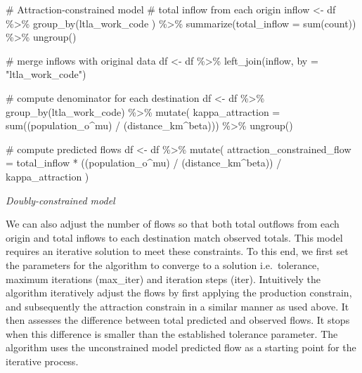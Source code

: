 \documentclass[
  a4paper, 
  twoside,
  final
]{article}
\newenvironment{Shaded}{\begin{snugshade}}{\end{snugshade}}
\newcommand{\AttributeTok}[1]{\textcolor[rgb]{0.40,0.45,0.13}{#1}}
\newcommand{\CommentTok}[1]{\textcolor[rgb]{0.37,0.37,0.37}{#1}}
\newcommand{\FunctionTok}[1]{\textcolor[rgb]{0.28,0.35,0.67}{#1}}
\newcommand{\NormalTok}[1]{\textcolor[rgb]{0.00,0.23,0.31}{#1}}
\newcommand{\OtherTok}[1]{\textcolor[rgb]{0.00,0.23,0.31}{#1}}
\newcommand{\SpecialCharTok}[1]{\textcolor[rgb]{0.37,0.37,0.37}{#1}}
\newcommand{\StringTok}[1]{\textcolor[rgb]{0.13,0.47,0.30}{#1}}
\newcounter{code}
\begin{document}
\begin{Shaded}
\begin{Highlighting}[]
\CommentTok{\# Attraction{-}constrained model}
\CommentTok{\# total inflow from each origin}
\NormalTok{inflow }\OtherTok{\textless{}{-}}\NormalTok{ df }\SpecialCharTok{\%\textgreater{}\%}
  \FunctionTok{group\_by}\NormalTok{(ltla\_work\_code ) }\SpecialCharTok{\%\textgreater{}\%}
  \FunctionTok{summarize}\NormalTok{(}\AttributeTok{total\_inflow =} \FunctionTok{sum}\NormalTok{(count)) }\SpecialCharTok{\%\textgreater{}\%} 
  \FunctionTok{ungroup}\NormalTok{()}

\CommentTok{\# merge inflows with original data}
\NormalTok{df }\OtherTok{\textless{}{-}}\NormalTok{ df }\SpecialCharTok{\%\textgreater{}\%}
  \FunctionTok{left\_join}\NormalTok{(inflow, }\AttributeTok{by =} \StringTok{"ltla\_work\_code"}\NormalTok{)}

\CommentTok{\# compute denominator for each destination}
\NormalTok{df }\OtherTok{\textless{}{-}}\NormalTok{ df }\SpecialCharTok{\%\textgreater{}\%}
  \FunctionTok{group\_by}\NormalTok{(ltla\_work\_code) }\SpecialCharTok{\%\textgreater{}\%}
  \FunctionTok{mutate}\NormalTok{(}
    \AttributeTok{kappa\_attraction =} 
      \FunctionTok{sum}\NormalTok{((population\_o}\SpecialCharTok{\^{}}\NormalTok{mu) }\SpecialCharTok{/}\NormalTok{ (distance\_km}\SpecialCharTok{\^{}}\NormalTok{beta))) }\SpecialCharTok{\%\textgreater{}\%}
  \FunctionTok{ungroup}\NormalTok{()}

\CommentTok{\# compute predicted flows}
\NormalTok{df }\OtherTok{\textless{}{-}}\NormalTok{ df }\SpecialCharTok{\%\textgreater{}\%} \FunctionTok{mutate}\NormalTok{(}
  \AttributeTok{attraction\_constrained\_flow =}
\NormalTok{    total\_inflow }\SpecialCharTok{*}\NormalTok{ ((population\_o}\SpecialCharTok{\^{}}\NormalTok{mu) }\SpecialCharTok{/}\NormalTok{ (distance\_km}\SpecialCharTok{\^{}}\NormalTok{beta)) }\SpecialCharTok{/} 
\NormalTok{    kappa\_attraction}
\NormalTok{  )}
\end{Highlighting}
\end{Shaded}

\emph{Doubly-constrained model}

We can also adjust the number of flows so that both total outflows from
each origin and total inflows to each destination match observed totals.
This model requires an iterative solution to meet these constraints. To
this end, we first set the parameters for the algorithm to converge to a
solution i.e.~tolerance, maximum iterations (max\_iter) and iteration
steps (iter). Intuitively the algorithm iteratively adjust the flows by
first applying the production constrain, and subsequently the attraction
constrain in a similar manner as used above. It then assesses the
difference between total predicted and observed flows. It stops when
this difference is smaller than the established tolerance parameter. The
algorithm uses the unconstrained model predicted flow as a starting
point for the iterative process.
\end{document}
